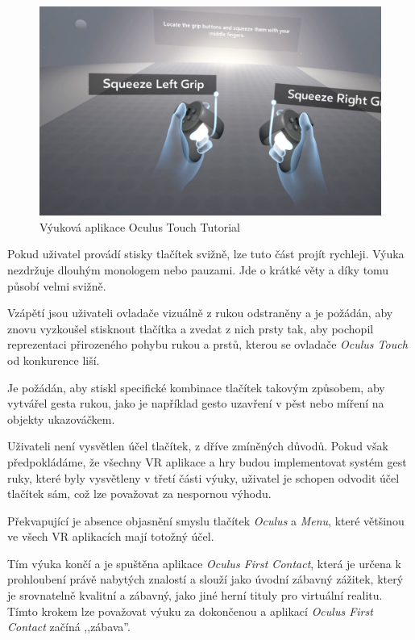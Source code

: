 \begin{figure}[h!]
\centering
\includegraphics[width=12cm]{src/assets/oculus-tutorial.png}
\caption{Výuková aplikace Oculus Touch Tutorial}
\end{figure}

Pokud uživatel provádí stisky tlačítek svižně, lze tuto část projít
rychleji. Výuka nezdržuje dlouhým monologem nebo pauzami. Jde o krátké
věty a díky tomu působí velmi svižně.

Vzápětí jsou uživateli ovladače vizuálně z rukou odstraněny a je
požádán, aby znovu vyzkoušel stisknout tlačítka a zvedat z nich prsty
tak, aby pochopil reprezentaci přirozeného pohybu rukou a prstů, kterou
se ovladače \emph{Oculus Touch} od konkurence liší. 

Je požádán, aby
stiskl specifické kombinace tlačítek takovým způsobem, aby vytvářel
gesta rukou, jako je například gesto uzavření v pěst nebo míření na
objekty ukazováčkem.

Uživateli není vysvětlen účel tlačítek, z dříve zmíněných důvodů. Pokud
však předpokládáme, že všechny VR aplikace a hry budou implementovat
systém gest ruky, které byly vysvětleny v třetí části výuky, uživatel je
schopen odvodit účel tlačítek sám, což lze považovat za nespornou
výhodu.

Překvapující je absence objasnění smyslu tlačítek \emph{Oculus} a
\emph{Menu}, které většinou ve všech VR aplikacích mají totožný účel.

Tím výuka končí a je spuštěna aplikace \emph{Oculus First Contact},
která je určena k prohloubení právě nabytých znalostí a slouží jako
úvodní zábavný zážitek, který je srovnatelně kvalitní a zábavný, jako
jiné herní tituly pro virtuální realitu. Tímto krokem lze považovat výuku
za dokončenou a aplikací \emph{Oculus First Contact} začíná
,,zábava''.

